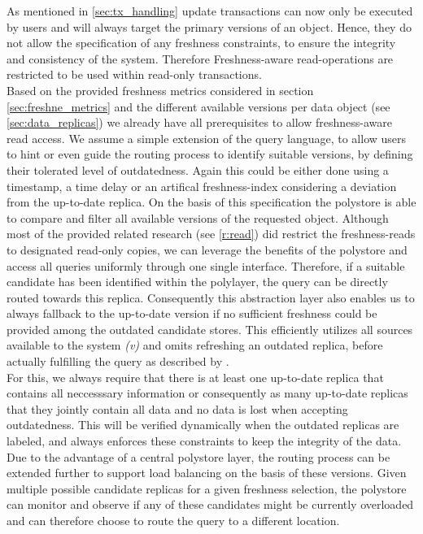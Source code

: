 As mentioned in \ref{sec:tx_handling} update transactions can now only be executed by users and will always target the primary versions of an object.
Hence, they do not allow the specification of any freshness constraints, to ensure the integrity and consistency of the system.
Therefore Freshness-aware read-operations are restricted to be used within read-only transactions.\\
Based on the provided freshness metrics considered in section \ref{sec:freshne_metrics} and the different available versions per data object (see \ref{sec:data_replicas})
we already have all prerequisites to allow freshness-aware read access. 
We assume a simple extension of the query language, to allow users to hint or even guide the routing process to identify suitable versions, 
by defining their tolerated level of outdatedness.
Again this could be either done using a timestamp, a time delay or an artifical freshness-index considering a deviation from the up-to-date replica.
On the basis of this specification the polystore is able to compare and filter all available versions of the requested object.
Although most of the provided related research (see \ref{r:read}) did restrict the freshness-reads to designated read-only copies, we can leverage the benefits 
of the polystore and access all queries uniformly through one single interface. Therefore, if a suitable candidate has been identified within the polylayer, 
the query can be directly routed towards this replica. Consequently this abstraction layer also enables us to always fallback to the up-to-date version
if no sufficient freshness could be provided among the outdated candidate stores. This efficiently utilizes all sources available to the system \textit{(v)}
and omits refreshing an outdated replica, before actually fulfilling the query as described by \cite{voicu:2010}.\\
For this, we always require that there is at least one up-to-date replica that contains all neccesssary information or consequently as many up-to-date replicas 
that they jointly contain all data and no data is lost when accepting outdatedness.
This will be verified dynamically when the outdated replicas are labeled, and always enforces these constraints to keep the integrity of the data.
Due to the advantage of a central polystore layer, the routing process can be extended further to support load balancing on the basis of these versions. 
Given multiple possible candidate replicas for a given freshness selection, the polystore can monitor and observe 
if any of these candidates might be currently overloaded and can therefore choose to route the query to a different location.
